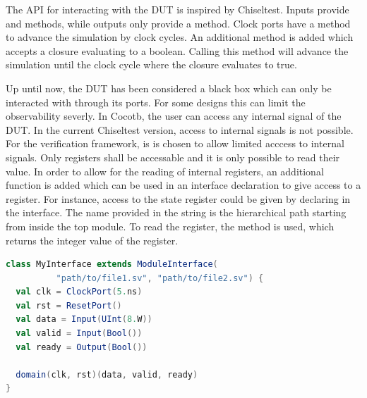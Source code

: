 The API for interacting with the DUT is inspired by Chiseltest. Inputs provide  and  methods,
while outputs only provide a  method. Clock ports have a  method to advance the simulation by
 clock cycles. An additional method  is added which accepts a closure evaluating to a boolean. Calling this method will advance the simulation until the clock cycle where the closure evaluates to true. 



Up until now, the DUT has been considered a black box which can only be interacted with through its ports. For some designs this can limit the observability severly. In Cocotb, the user can access any internal signal of the DUT. In the current Chiseltest version, access to internal signals is not possible. For the verification framework, is is chosen to allow limited acccess to internal signals. Only registers shall be accessable and it is only possible to read their value. In order to allow for the reading of internal registers, an additional function is added which can be used in an interface declaration to give access to a register. For instance, access to the state register could be given by declaring  in the interface. The name provided in the string is the hierarchical path starting from inside the top module. To read the register, the  method is used, which returns the integer value of the register.


\begin{listing}
\begin{lstlisting}[language=scala, captionpos=b, caption=Example for an interface declaration in Scala. Each data signal is assocaited with a clock domain.,label=lst:interface]
class MyInterface extends ModuleInterface(
          "path/to/file1.sv", "path/to/file2.sv") {
  val clk = ClockPort(5.ns)
  val rst = ResetPort()
  val data = Input(UInt(8.W))
  val valid = Input(Bool())
  val ready = Output(Bool())

  domain(clk, rst)(data, valid, ready)
}
\end{lstlisting}
\end{listing}

